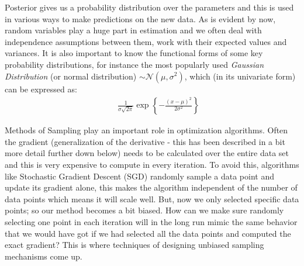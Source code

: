 \documentclass[a4paper]{article}
\begin{document}
\noindent Posterior gives us a probability distribution over the parameters and this is used in various ways to make predictions on the new data. As is evident by now, random variables play a huge part in estimation and we often deal with independence assumptions between them, work with their expected values and variances. It is also important to know the functional forms of some key probability distributions, for instance the most popularly used {\it Gaussian Distribution} (or normal distribution) $\sim \mathcal{N} (\mu, \sigma^2)$, which (in its univariate form) can be expressed as: \\

\begin{equation} \label{eq:4}
\begin{aligned}
& & \frac{1}{\sigma \sqrt{2 \pi}} \exp \left\{ - \frac{(x-\mu)^2}{2 \sigma^2} \right\}
\end{aligned}
\end{equation}

\noindent Methods of Sampling play an important role in optimization algorithms. Often the gradient (generalization of the derivative - this has been described in a bit more detail further down below) needs to be calculated over the entire data set and this is very expensive to compute in every iteration. To avoid this, algorithms like Stochastic Gradient Descent (SGD) randomly sample a data point and update its gradient alone, this makes the algorithm independent of the number of data points which means it will scale well. But, now we only selected specific data points; so our method becomes a bit biased. How can we make sure randomly selecting one point in each iteration will in the long run mimic the same behavior that we would have got if we had selected all the data points and computed the exact gradient? This is where techniques of designing unbiased sampling mechanisms come up. \\
\end{document}
